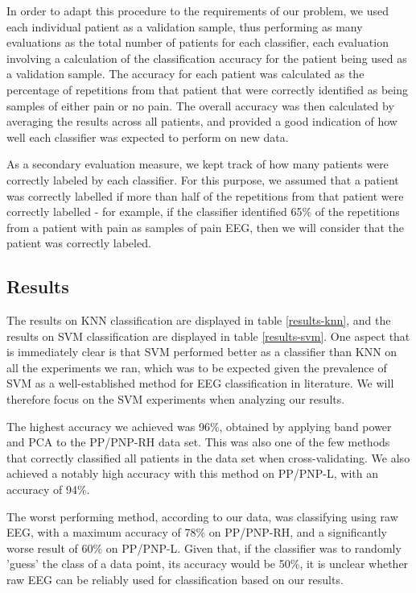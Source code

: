\documentclass{mpaper}
\begin{document}
In order to adapt this procedure to the requirements of our problem, we used each individual patient as a validation sample, thus performing as many evaluations as the total number of patients for each classifier, each evaluation involving a calculation of the classification accuracy for the patient being used as a validation sample. The accuracy for each patient was calculated as the percentage of repetitions from that patient that were correctly identified as being samples of either pain or no pain. The overall accuracy was then calculated by averaging the results across all patients, and provided a good indication of how well each classifier was expected to perform on new data.

As a secondary evaluation measure, we kept track of how many patients were correctly labeled by each classifier. For this purpose, we assumed that a patient was correctly labelled if more than half of the repetitions from that patient were correctly labelled - for example, if the classifier identified 65\% of the repetitions from a patient with pain as samples of pain EEG, then we will consider that the patient was correctly labeled.

\subsection{Results}
\label{results}

The results on KNN classification are displayed in table \ref{results-knn}, and the results on SVM classification are displayed in table \ref{results-svm}. One aspect that is immediately clear is that SVM performed better as a classifier than KNN on all the experiments we ran, which was to be expected given the prevalence of SVM as a well-established method for EEG classification in literature. We will therefore focus on the SVM experiments when analyzing our results.

The highest accuracy we achieved was 96\%, obtained by applying band power and PCA to the PP/PNP-RH data set. This was also one of the few methods that correctly classified all patients in the data set when cross-validating. We also achieved a notably high accuracy with this method on PP/PNP-L, with an accuracy of 94\%.

The worst performing method, according to our data, was classifying using raw EEG, with a maximum accuracy of 78\% on PP/PNP-RH, and a significantly worse result of 60\% on PP/PNP-L. Given that, if the classifier was to randomly 'guess' the class of a data point, its accuracy would be 50\%, it is unclear whether raw EEG can be reliably used for classification based on our results.
\end{document}
